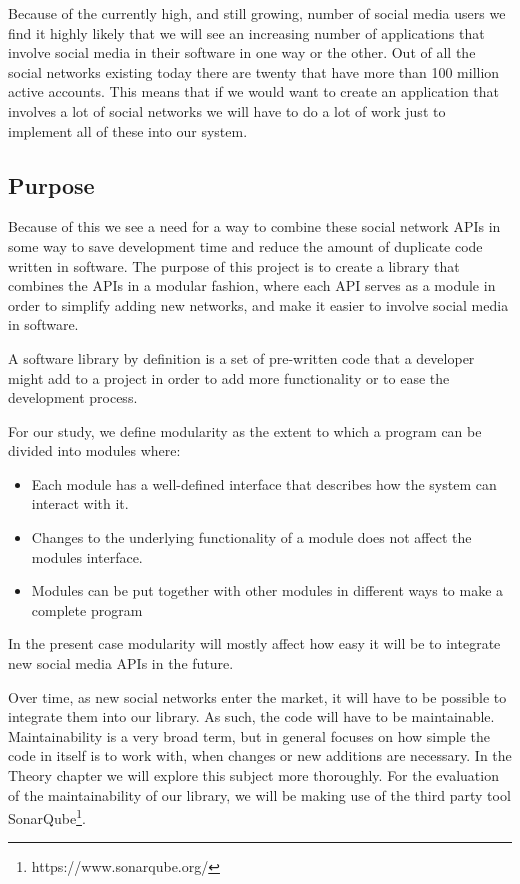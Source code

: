 \documentclass{sigchi-alternate}
\begin{document}
Because of the currently high, and still growing, number of social media users we find it highly likely that we will see an increasing number of
applications that involve social media in their software in one way or the other. Out of all the social networks existing today there are twenty
that have more than 100 million active accounts\autocite{STATISTA_LEADING_SOCIAL_NETWORKS}. This means that if we would want to create an application
that involves a lot of social networks we will have to do a lot of work just to implement all of these into our system.

\subsection{Purpose}
Because of this we see a need for a way to combine these social network APIs in some way to save development
time and reduce the amount of duplicate code written in software. The purpose of this project is to create a library 
that combines the APIs in a modular fashion, where each API serves as a module in order to simplify adding new networks,
and make it easier to involve social media in software. 

A software library by definition is a set of pre-written code that a developer might add to a project in order to add more functionality or to ease the 
development process\autocite{TLDP_LIBRARY_DEFINITION}. 

For our study, we define modularity as the extent to which a program can be divided into modules where\autocite{Kiczales:2005:APM:1062455.1062482}:
\begin{itemize}
	\item Each module has a well-defined interface that describes how the system can interact with it.
	\item Changes to the underlying functionality of a module does not affect the modules interface.
	\item Modules can be put together with other modules in different ways to make a complete program
\end{itemize}
In the present case modularity will mostly affect how easy it will be to integrate new social media APIs in the future.

Over time, as new social networks enter the market, it will have to be possible to integrate them into our library. As such, the code will have to be maintainable.
Maintainability is a very broad term, but in general focuses on how simple the code in itself is to work with, when changes or new additions are necessary.
In the Theory chapter we will explore this subject more thoroughly. For the evaluation of the maintainability of our library, we will be making use of the third
party tool SonarQube\footnote{https://www.sonarqube.org/}.
\end{document}
